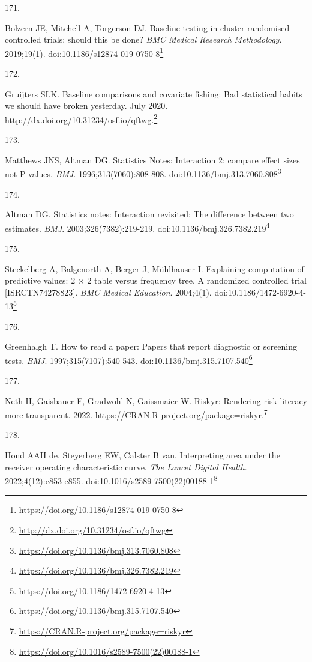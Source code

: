 \documentclass[
  a4paper,
]{book}
\newlength{\cslhangindent}
\newlength{\csllabelwidth}
\newlength{\cslentryspacingunit} %
\newenvironment{CSLReferences}[2] %
 {%
  \setlength{\parindent}{0pt}
  \ifodd #1
  \let\oldpar\par
  \def\par{\hangindent=\cslhangindent\oldpar}
  \fi
  \setlength{\parskip}{#2\cslentryspacingunit}
 }%
 {}
\newcommand{\CSLLeftMargin}[1]{\parbox[t]{\csllabelwidth}{#1}}
\newcommand{\CSLRightInline}[1]{\parbox[t]{\linewidth - \csllabelwidth}{#1}\break}
\renewcommand{\href}[2]{#2\footnote{\url{#1}}}
\begin{document}
\begin{CSLReferences}{0}{0}
\leavevmode{}%
\CSLLeftMargin{171. }%
\CSLRightInline{Bolzern JE, Mitchell A, Torgerson DJ. Baseline testing in cluster randomised controlled trials: should this be done? \emph{BMC Medical Research Methodology}. 2019;19(1). doi:\href{https://doi.org/10.1186/s12874-019-0750-8}{10.1186/s12874-019-0750-8}}

\leavevmode{}%
\CSLLeftMargin{172. }%
\CSLRightInline{Gruijters SLK. Baseline comparisons and covariate fishing: Bad statistical habits we should have broken yesterday. July 2020. \href{http://dx.doi.org/10.31234/osf.io/qftwg}{http://dx.doi.org/10.31234/osf.io/qftwg.}}

\leavevmode{}%
\CSLLeftMargin{173. }%
\CSLRightInline{Matthews JNS, Altman DG. Statistics Notes: Interaction 2: compare effect sizes not P values. \emph{BMJ}. 1996;313(7060):808-808. doi:\href{https://doi.org/10.1136/bmj.313.7060.808}{10.1136/bmj.313.7060.808}}

\leavevmode{}%
\CSLLeftMargin{174. }%
\CSLRightInline{Altman DG. Statistics notes: Interaction revisited: The difference between two estimates. \emph{BMJ}. 2003;326(7382):219-219. doi:\href{https://doi.org/10.1136/bmj.326.7382.219}{10.1136/bmj.326.7382.219}}

\leavevmode{}%
\CSLLeftMargin{175. }%
\CSLRightInline{Steckelberg A, Balgenorth A, Berger J, Mühlhauser I. Explaining computation of predictive values: 2 × 2 table versus frequency tree. A randomized controlled trial {[}ISRCTN74278823{]}. \emph{BMC Medical Education}. 2004;4(1). doi:\href{https://doi.org/10.1186/1472-6920-4-13}{10.1186/1472-6920-4-13}}

\leavevmode{}%
\CSLLeftMargin{176. }%
\CSLRightInline{Greenhalgh T. How to read a paper: Papers that report diagnostic or screening tests. \emph{BMJ}. 1997;315(7107):540-543. doi:\href{https://doi.org/10.1136/bmj.315.7107.540}{10.1136/bmj.315.7107.540}}

\leavevmode{}%
\CSLLeftMargin{177. }%
\CSLRightInline{Neth H, Gaisbauer F, Gradwohl N, Gaissmaier W. Riskyr: Rendering risk literacy more transparent. 2022. \href{https://CRAN.R-project.org/package=riskyr}{https://CRAN.R-project.org/package=riskyr.}}

\leavevmode{}%
\CSLLeftMargin{178. }%
\CSLRightInline{Hond AAH de, Steyerberg EW, Calster B van. Interpreting area under the receiver operating characteristic curve. \emph{The Lancet Digital Health}. 2022;4(12):e853-e855. doi:\href{https://doi.org/10.1016/s2589-7500(22)00188-1}{10.1016/s2589-7500(22)00188-1}}


\end{CSLReferences}
\end{document}
